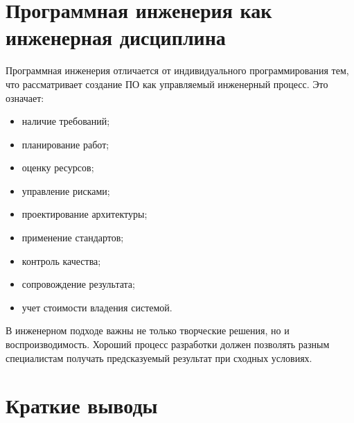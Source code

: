 \documentclass[12pt,a4paper]{article}
\begin{document}
\section{Программная инженерия как инженерная дисциплина}

Программная инженерия отличается от индивидуального программирования тем, что рассматривает создание ПО как управляемый инженерный процесс. Это означает:

\begin{itemize}
    \item наличие требований;
    \item планирование работ;
    \item оценку ресурсов;
    \item управление рисками;
    \item проектирование архитектуры;
    \item применение стандартов;
    \item контроль качества;
    \item сопровождение результата;
    \item учет стоимости владения системой.
\end{itemize}

В инженерном подходе важны не только творческие решения, но и воспроизводимость. Хороший процесс разработки должен позволять разным специалистам получать предсказуемый результат при сходных условиях.

\section{Краткие выводы}
\end{document}
